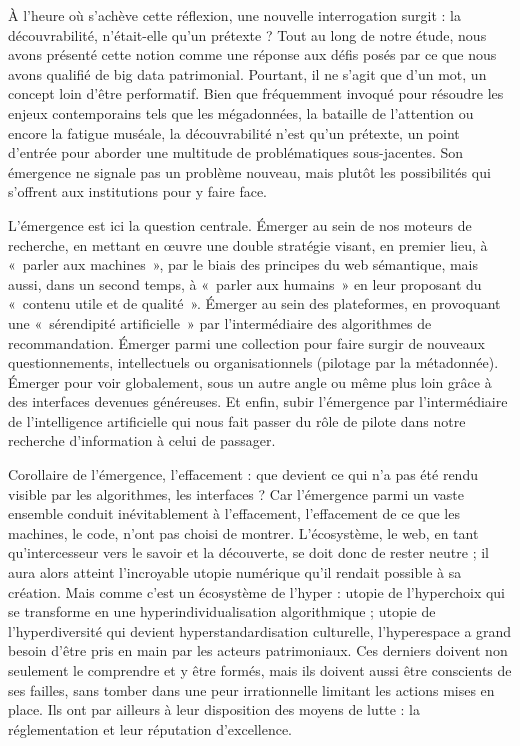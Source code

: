 \documentclass[a4paper,12pt,twoside]{book}
\begin{document}
	À l'heure où s'achève cette réflexion, une nouvelle interrogation surgit : la découvrabilité, n'était-elle qu'un prétexte ? Tout au long de notre étude, nous avons présenté cette notion comme une réponse aux défis posés par ce que nous avons qualifié de big data patrimonial. Pourtant, il ne s'agit que d'un mot, un concept loin d’être performatif. Bien que fréquemment invoqué pour résoudre les enjeux contemporains tels que les mégadonnées, la bataille de l'attention ou encore la fatigue muséale, la découvrabilité n’est qu’un prétexte, un point d'entrée pour aborder une multitude de problématiques sous-jacentes. Son émergence ne signale pas un problème nouveau, mais plutôt les possibilités qui s'offrent aux institutions pour y faire face.
	
	L’émergence est ici la question centrale. Émerger au sein de nos moteurs de recherche, en mettant en œuvre une double stratégie visant, en premier lieu, à « parler aux machines », par le biais des principes du web sémantique, mais aussi, dans un second temps, à « parler aux humains » en leur proposant du « contenu utile et de qualité ». Émerger au sein des plateformes, en provoquant une « sérendipité artificielle » par l’intermédiaire des algorithmes de recommandation. Émerger parmi une collection pour faire surgir de nouveaux questionnements, intellectuels ou organisationnels (pilotage par la métadonnée). Émerger pour voir globalement, sous un autre angle ou même plus loin grâce à des interfaces devenues généreuses. Et enfin, subir l’émergence par l’intermédiaire de l'intelligence artificielle qui nous fait passer du rôle de pilote dans notre recherche d’information à celui de passager.
	
	Corollaire de l’émergence, l’effacement : que devient ce qui n’a pas été rendu visible par les algorithmes, les interfaces ? Car l’émergence parmi un vaste ensemble conduit inévitablement à l’effacement, l’effacement de ce que les machines, le code, n’ont pas choisi de montrer. L’écosystème, le web, en tant qu’intercesseur vers le savoir et la découverte, se doit donc de rester neutre ; il aura alors atteint l’incroyable utopie numérique qu’il rendait possible à sa création. Mais comme c’est un écosystème de l’hyper : utopie de l’hyperchoix qui se transforme en une hyperindividualisation algorithmique ; utopie de l’hyperdiversité qui devient hyperstandardisation culturelle, l’hyperespace a grand besoin d’être pris en main par les acteurs patrimoniaux. Ces derniers doivent non seulement le comprendre et y être formés, mais ils doivent aussi être conscients de ses failles, sans tomber dans une peur irrationnelle limitant les actions mises en place. Ils ont par ailleurs à leur disposition des moyens de lutte : la réglementation et leur réputation d’excellence.
	
\end{document}
